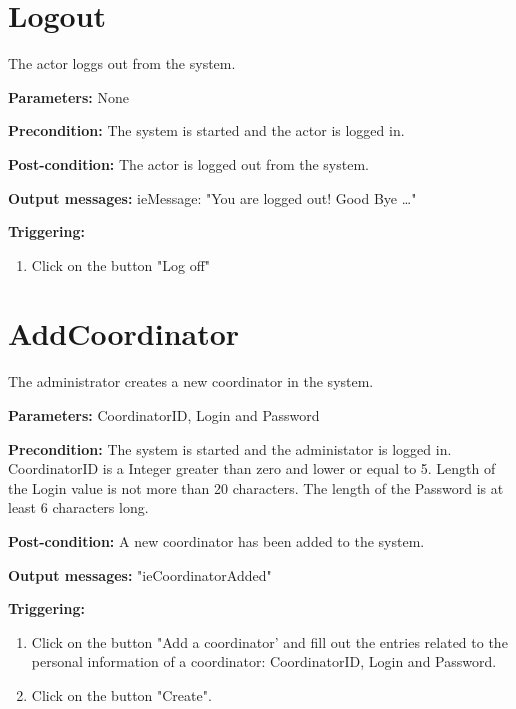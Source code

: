 \section{Logout}
\label{operation:Logout}

The actor loggs out from the system.

\begin{description}
	\item \textbf{Parameters:} None
	\item \textbf{Precondition:} The system is started and the actor is logged in.
	\item \textbf{Post-condition:} The actor is logged out from the system.
	\item \textbf{Output messages:} ieMessage: "You are logged out! Good Bye
	\ldots"
	
	\item \textbf{Triggering:}
	
	\begin{enumerate}
		\item Click on the button "Log off"
	\end{enumerate}
\end{description}



\section{AddCoordinator}
\label{operation:AddCoordinator}

The administrator creates a new coordinator in the system.

\begin{description}
	\item \textbf{Parameters:} CoordinatorID, Login and Password
	\item \textbf{Precondition:} The system is started and the administator is
	logged in. CoordinatorID is a Integer greater than zero and lower or equal to
	5. Length of the Login value is not more than 20 characters. The length of the
	Password is at least 6 characters long.
	\item \textbf{Post-condition:} A new coordinator has been added to the system.
	\item \textbf{Output messages:} "ieCoordinatorAdded"
	
	\item \textbf{Triggering:}
	
	\begin{enumerate}
		\item Click on the button "Add a coordinator' and fill out the entries related
		to the personal information of a coordinator: CoordinatorID, Login and Password.
		\item Click on the button "Create".
	\end{enumerate}
\end{description}

